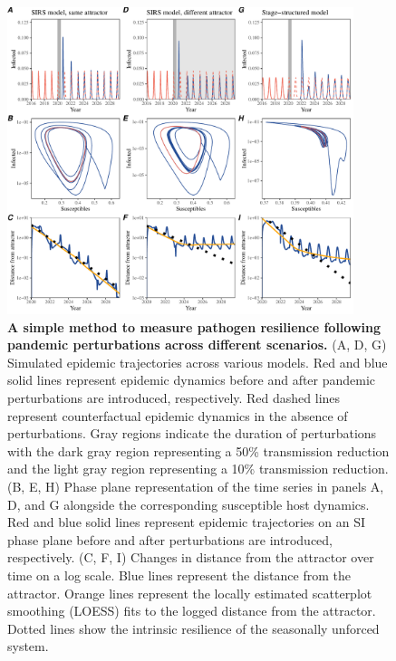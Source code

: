 \documentclass[12pt]{article}
\begin{document}
\begin{figure}[!th]
\begin{center}
\includegraphics[width=0.9\textwidth]{../figure2/figure2_simple.pdf}
\caption{
\textbf{A simple method to measure pathogen resilience following pandemic perturbations across different scenarios.}
(A, D, G) Simulated epidemic trajectories across various models. 
Red and blue solid lines represent epidemic dynamics before and after pandemic perturbations are introduced, respectively.
Red dashed lines represent counterfactual epidemic dynamics in the absence of perturbations.
Gray regions indicate the duration of perturbations with the dark gray region representing a 50\% transmission reduction and the light gray region representing a 10\% transmission reduction.
(B, E, H) Phase plane representation of the time series in panels A, D, and G alongside the corresponding susceptible host dynamics.
Red and blue solid lines represent epidemic trajectories on an SI phase plane before and after perturbations are introduced, respectively.
(C, F, I) Changes in distance from the attractor over time on a log scale.
Blue lines represent the distance from the attractor.
Orange lines represent the locally estimated scatterplot smoothing (LOESS) fits to the logged distance from the attractor.
Dotted lines show the intrinsic resilience of the seasonally unforced system.
}
\end{center}
\end{figure}
\end{document}
